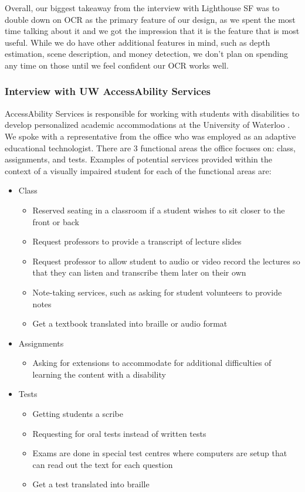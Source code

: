 \documentclass[a4paper,11pt]{article}
\begin{document}
\noindent
Overall, our biggest takeaway from the interview with Lighthouse SF was to double down on OCR as the primary feature of our design, as we spent the most time talking about it and we got the impression that it is the feature that is most useful. While we do have other additional features in mind, such as depth estimation, scene description, and money detection, we don't plan on spending any time on those until we feel confident our OCR works well.

\subsubsection{Interview with UW AccessAbility Services}
AccessAbility Services is responsible for working with students with disabilities to develop personalized academic accommodations at the University of Waterloo \cite{uw-accessability}. We spoke with a representative from the office who was employed as an adaptive educational technologist. There are 3 functional areas the office focuses on: class, assignments, and tests. Examples of potential services provided within the context of a visually impaired student for each of the functional areas are:
\begin{itemize}
    \item Class
    \begin{itemize}
        \item Reserved seating in a classroom if a student wishes to sit closer to the front or back
        \item Request professors to provide a transcript of lecture slides
        \item Request professor to allow student to audio or video record the lectures so that they can listen and transcribe them later on their own
        \item Note-taking services, such as asking for student volunteers to provide notes
        \item Get a textbook translated into braille or audio format
    \end{itemize}
    
    \item Assignments
    \begin{itemize}
        \item Asking for extensions to accommodate for additional difficulties of learning the content with a disability
    \end{itemize}
    
    \item Tests
    \begin{itemize}
        \item Getting students a scribe
        \item Requesting for oral tests instead of written tests
        \item Exams are done in special test centres where computers are setup that can read out the text for each question
        \item Get a test translated into braille
    \end{itemize}
\end{itemize}
\end{document}
